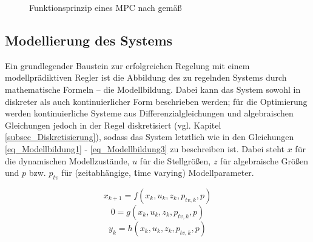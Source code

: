 \begin{figure}[h!]
    \centering
    \setlength{\fboxsep}{1pt}
    \setlength{\fboxrule}{1pt}
\caption[Funktionsprinzip eines MPC]{Funktionsprinzip eines MPC nach \cite[S.3]{Schwenzer} gemäß \cite{Richalet}}
    \label{fig_MPCVerhalten}
\end{figure}

\subsection{Modellierung des Systems} \label{subsec_Modellbildung}
Ein grundlegender Baustein zur erfolgreichen Regelung mit einem modellprädiktiven Regler ist die Abbildung des zu regelnden Systems durch mathematische Formeln – die Modellbildung.
Dabei kann das System sowohl in diskreter als auch kontinuierlicher Form beschrieben werden; für die Optimierung werden kontinuierliche Systeme aus Differenzialgleichungen und algebraischen Gleichungen jedoch in der Regel diskretisiert (vgl. Kapitel \ref{subsec_Diskretisierung}), sodass das System letztlich wie in den Gleichungen \ref{eq_Modellbildung1} - \ref{eq_Modellbildung3} zu beschreiben ist.
Dabei steht $x$ für die dynamischen Modellzustände, $u$ für die Stellgrößen, $z$ für algebraische Größen und $p$ bzw.
$p_{tv}$ für (zeitabhängige, \textbf{t}ime \textbf{v}arying) Modellparameter. \cite[S.3]{Schwenzer}\cite{Dompc1}

\begin{equation} \label{eq_Modellbildung1}
    x_{k+1} = f(x_k, u_k, z_k, p_{tv,k}, p)
\end{equation}
\vspace*{-2.5\baselineskip}
\begin{equation} \label{eq_Modellbildung2}
    0 = g(x_k, u_k, z_k, p_{tv,k}, p)
\end{equation}
\vspace*{-2.5\baselineskip}
\begin{equation} \label{eq_Modellbildung3}
    y_k = h(x_k, u_k, z_k, p_{tv,k}, p)
\end{equation}

